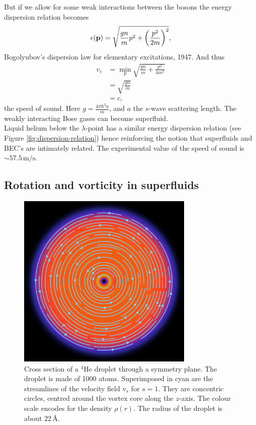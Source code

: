 \documentclass[11pt,a4paper,twoside]{article}
\renewcommand{\vec}[1]{\bm{\mathrm{#1}}}
\newcommand{\unit}[1]{\,\mathrm{#1}}
\begin{document}
			But if we allow for some weak interactions between the bosons the energy dispersion relation becomes
			\begin{align}
				\epsilon(\vec{p})=\sqrt{\frac{gn}{m}p^2+\qty(\frac{p^2}{2m})^2},
			\end{align}
			Bogolyubov's dispersion law for elementary excitations, 1947. And thus
			\begin{align}
				v_c &=\min_{\vec{p}}\sqrt{\frac{gn}{m}+\frac{p^2}{4m^2}} \\
					&= \sqrt{\frac{gn}{m}} \\
					&= c,
			\end{align}
			the speed of sound. Here $g=\frac{4\pi\hbar^2a}{m}$, and $a$ the $s$-wave scattering length. The weakly interacting Bose gases can become superfluid.\\			

			Liquid helium below the $\lambda$-point has a similar energy dispersion relation (see Figure \ref{fig:dispersion-relation}) hence reinforcing the notion that superfluids and BEC's are intimately related. The experimental value of the speed of sound is $\sim\!57.5\unit{m/s}$.
			
		\subsection{Rotation and vorticity in superfluids}\label{sec:rot-vort}
		\begin{figure}[t]
			\begin{center}
				\includegraphics[width=0.75\textwidth]{vortex-xy}
			\end{center}
			\caption{Cross section of a $^4$He droplet through a symmetry plane. The droplet is made of 1000 atoms. Superimposed in cyan are the streamlines of the velocity field $\vec{v}_s$ for $s=1$. They are concentric circles, centred around the vortex core along the $z$-axis. The colour scale encodes for the density $\rho(r)$. The radius of the droplet is about 22\,\AA.}
			\label{fig:vortex-xy}
		\end{figure}
		
\end{document}
